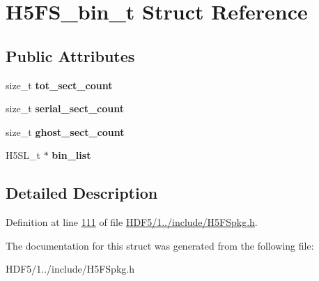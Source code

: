 \hypertarget{struct_h5_f_s__bin__t}{}\section{H5\+F\+S\+\_\+bin\+\_\+t Struct Reference}
\label{struct_h5_f_s__bin__t}
\subsection*{Public Attributes}
\begin{DoxyCompactItemize}
\item 
\mbox{\label{struct_h5_f_s__bin__t_a817c88401108a4d0c112a46e8934aed5}} 
size\+\_\+t {\bfseries tot\+\_\+sect\+\_\+count}
\item 
\mbox{\label{struct_h5_f_s__bin__t_a9ae0c9b72654ee25fcc82dbcfc3ec6b1}} 
size\+\_\+t {\bfseries serial\+\_\+sect\+\_\+count}
\item 
\mbox{\label{struct_h5_f_s__bin__t_ac4d2eeeb4dda849794535d77fe882e91}} 
size\+\_\+t {\bfseries ghost\+\_\+sect\+\_\+count}
\item 
\mbox{\label{struct_h5_f_s__bin__t_a4e06bdf0f1729b764e750e29ca5c2671}} 
H5\+S\+L\+\_\+t $\ast$ {\bfseries bin\+\_\+list}
\end{DoxyCompactItemize}


\subsection{Detailed Description}


Definition at line \hyperlink{_h_d_f5_21_810_81_2include_2_h5_f_spkg_8h_source_l00111}{111} of file \hyperlink{_h_d_f5_21_810_81_2include_2_h5_f_spkg_8h_source}{H\+D\+F5/1../include/\+H5\+F\+Spkg.\+h}.



The documentation for this struct was generated from the following file\+:\begin{DoxyCompactItemize}
\item 
H\+D\+F5/1../include/\+H5\+F\+Spkg.\+h\end{DoxyCompactItemize}
